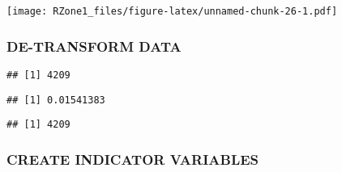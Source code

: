 \documentclass[11pt,]{article}
\newenvironment{Shaded}{\begin{snugshade}}{\end{snugshade}}
\newcommand{\CommentTok}[1]{\textcolor[rgb]{0.56,0.35,0.01}{\textit{#1}}}
\newcommand{\DecValTok}[1]{\textcolor[rgb]{0.00,0.00,0.81}{#1}}
\newcommand{\KeywordTok}[1]{\textcolor[rgb]{0.13,0.29,0.53}{\textbf{#1}}}
\newcommand{\NormalTok}[1]{#1}
\newcommand{\OperatorTok}[1]{\textcolor[rgb]{0.81,0.36,0.00}{\textbf{#1}}}
\newcommand{\StringTok}[1]{\textcolor[rgb]{0.31,0.60,0.02}{#1}}
\begin{document}
\texttt{[image: RZone1\_files/figure-latex/unnamed-chunk-26-1.pdf]}

\hypertarget{de-transform-data}{%
\subsubsection{DE-TRANSFORM DATA}\label{de-transform-data}}

\begin{Shaded}
\end{Shaded}

\begin{verbatim}
## [1] 4209
\end{verbatim}

\begin{verbatim}
## [1] 0.01541383
\end{verbatim}

\begin{verbatim}
## [1] 4209
\end{verbatim}

\hypertarget{create-indicator-variables}{%
\subsubsection{CREATE INDICATOR
VARIABLES}\label{create-indicator-variables}}
\end{document}
